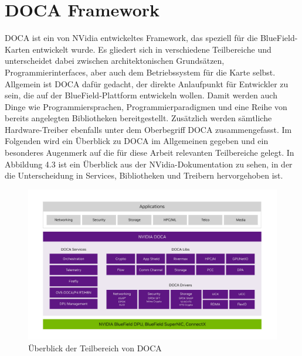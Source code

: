 \section{DOCA Framework}
DOCA ist ein von NVidia entwickeltes Framework, das speziell für die BlueField-Karten entwickelt wurde. Es gliedert sich in verschiedene Teilbereiche und unterscheidet dabei zwischen architektonischen Grundsätzen, Programmierinterfaces, aber auch dem Betriebssystem für die Karte selbst. Allgemein ist DOCA dafür gedacht, der direkte Anlaufpunkt für Entwickler zu sein, die auf der BlueField-Plattform entwickeln wollen. Damit werden auch Dinge wie Programmiersprachen, Programmierparadigmen und eine Reihe von bereits angelegten Bibliotheken bereitgestellt. Zusätzlich werden sämtliche Hardware-Treiber ebenfalls unter dem Oberbegriff DOCA zusammengefasst. \cite{nvidia_doca_framework} Im Folgenden wird ein Überblick zu DOCA im Allgemeinen gegeben und ein besonderes Augenmerk auf die für diese Arbeit relevanten Teilbereiche gelegt. In Abbildung 4.3 ist ein Überblick aus der NVidia-Dokumentation zu sehen, in der die Unterscheidung in Services, Bibliotheken und Treibern hervorgehoben ist.
\begin{figure}
    \centering
    \includegraphics[width=1\linewidth]{images/Screenshot 2025-04-26 at 08-31-41 DOCA Overview - NVIDIA Docs.png}
    \caption{Überblick der Teilbereich von DOCA \cite{nvidia_doca_framework}}
    \label{fig:enter-label}
\end{figure}
